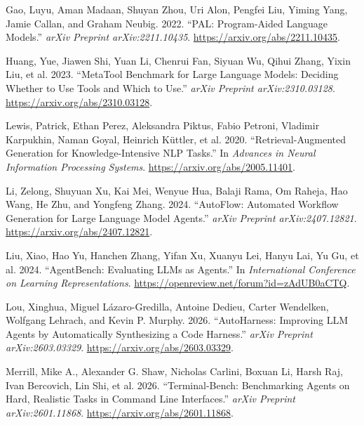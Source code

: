 \documentclass[
  10pt,
]{article}
\newlength{\cslhangindent}
\newenvironment{CSLReferences}[2] %
 {\begin{list}{}{%
  \setlength{\itemindent}{0pt}
  \setlength{\leftmargin}{0pt}
  \setlength{\parsep}{0pt}
  \ifodd #1
   \setlength{\leftmargin}{\cslhangindent}
   \setlength{\itemindent}{-1\cslhangindent}
  \fi
  \setlength{\itemsep}{#2\baselineskip}}}
 {\end{list}}
\begin{document}
\protect{}\label{refs}
\begin{CSLReferences}{1}{0}
Gao, Luyu, Aman Madaan, Shuyan Zhou, Uri Alon, Pengfei Liu, Yiming Yang,
Jamie Callan, and Graham Neubig. 2022. {``PAL: Program-Aided Language
Models.''} \emph{arXiv Preprint arXiv:2211.10435}.
\url{https://arxiv.org/abs/2211.10435}.

Huang, Yue, Jiawen Shi, Yuan Li, Chenrui Fan, Siyuan Wu, Qihui Zhang,
Yixin Liu, et al. 2023. {``MetaTool Benchmark for Large Language Models:
Deciding Whether to Use Tools and Which to Use.''} \emph{arXiv Preprint
arXiv:2310.03128}. \url{https://arxiv.org/abs/2310.03128}.

Lewis, Patrick, Ethan Perez, Aleksandra Piktus, Fabio Petroni, Vladimir
Karpukhin, Naman Goyal, Heinrich Küttler, et al. 2020.
{``Retrieval-Augmented Generation for Knowledge-Intensive NLP Tasks.''}
In \emph{Advances in Neural Information Processing Systems}.
\url{https://arxiv.org/abs/2005.11401}.

Li, Zelong, Shuyuan Xu, Kai Mei, Wenyue Hua, Balaji Rama, Om Raheja, Hao
Wang, He Zhu, and Yongfeng Zhang. 2024. {``AutoFlow: Automated Workflow
Generation for Large Language Model Agents.''} \emph{arXiv Preprint
arXiv:2407.12821}. \url{https://arxiv.org/abs/2407.12821}.

Liu, Xiao, Hao Yu, Hanchen Zhang, Yifan Xu, Xuanyu Lei, Hanyu Lai, Yu
Gu, et al. 2024. {``AgentBench: Evaluating LLMs as Agents.''} In
\emph{International Conference on Learning Representations}.
\url{https://openreview.net/forum?id=zAdUB0aCTQ}.

Lou, Xinghua, Miguel Lázaro-Gredilla, Antoine Dedieu, Carter Wendelken,
Wolfgang Lehrach, and Kevin P. Murphy. 2026. {``AutoHarness: Improving
LLM Agents by Automatically Synthesizing a Code Harness.''} \emph{arXiv
Preprint arXiv:2603.03329}. \url{https://arxiv.org/abs/2603.03329}.

Merrill, Mike A., Alexander G. Shaw, Nicholas Carlini, Boxuan Li, Harsh
Raj, Ivan Bercovich, Lin Shi, et al. 2026. {``Terminal-Bench:
Benchmarking Agents on Hard, Realistic Tasks in Command Line
Interfaces.''} \emph{arXiv Preprint arXiv:2601.11868}.
\url{https://arxiv.org/abs/2601.11868}.


\end{CSLReferences}
\end{document}
